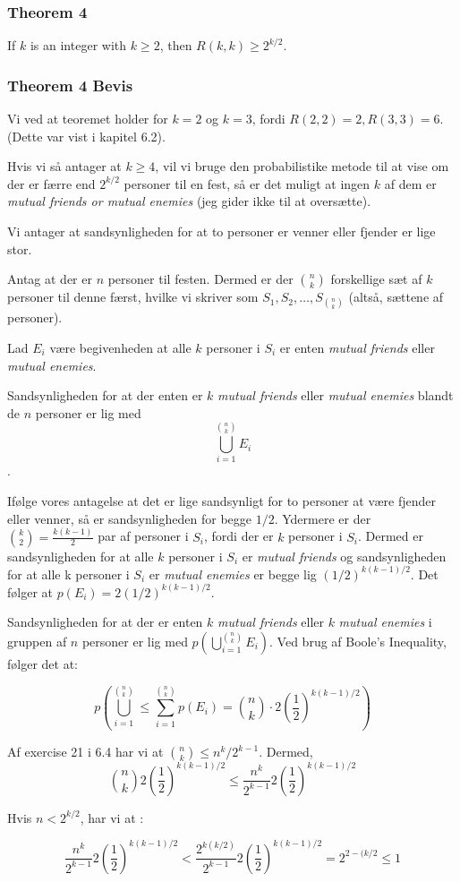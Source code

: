 \documentclass{beamer}
\begin{document}
\begin{frame}
  \frametitle{Theorem 4}
  \begin{theorem}
If $k$ is an integer with $k \geq 2$, then $R(k,k) \geq 2^{k/2}.$
  \end{theorem}
\end{frame}

\begin{frame}[allowframebreaks]
  \frametitle{Theorem 4 Bevis}
  Vi ved at teoremet holder for $k = 2$ og $k = 3$, fordi $R(2,2) = 2, R(3,3) = 6$. (Dette var vist i kapitel 6.2).

  Hvis vi så antager at $k \geq 4$, vil vi bruge den probabilistike metode til at vise om der er færre end $2^{k/2}$ personer til en fest, så er det muligt at ingen $k$ af dem er \textit{mutual friends or mutual enemies} (jeg gider ikke til at oversætte).

  Vi antager at sandsynligheden for at to personer er venner eller fjender er lige stor.

  Antag at der er $n$ personer til festen. Dermed er der $\binom{n}{k}$ forskellige sæt af $k$ personer til denne færst, hvilke vi skriver som $S_{1}, S_{2}, \ldots, S_{\binom{n}{k}}$ (altså, sættene af personer).

  Lad $E_{i}$ være begivenheden at alle $k$  personer i $S_{i}$ er enten \textit{mutual friends} eller \textit{mutual enemies}.

  Sandsynligheden for at der enten er $k$ \textit{mutual friends} eller \textit{mutual enemies} blandt de $n$ personer er lig med \[ \bigcup\limits_{i=1}^{\binom{n}{k}}E_{i} \].

  Ifølge vores antagelse at det er lige sandsynligt for to personer at være fjender eller venner, så er sandsynligheden for begge $1/2$. Ydermere er der $\binom{k}{2} = \frac{k(k-1)}{2}$ par af personer i $S_{i}$, fordi der er $k$ personer i $S_{i}$. Dermed er sandsynligheden for at alle $k$ personer i $S_{i}$ er \textit{mutual friends} og sandsynligheden for at alle k personer i $S_{i}$ er \textit{mutual enemies} er begge lig $(1/2)^{k(k-1)/2}$. Det følger at $p(E_{i}) = 2(1/2)^{k(k-1)/2}$.

  Sandsynligheden for at der er enten $k$ \textit{mutual friends} eller $k$ \textit{mutual enemies} i gruppen af $n$ personer er lig med $p(\bigcup\limits_{i=1}^{\binom{n}{k}} E_{i})$. Ved brug af Boole's Inequality, følger det at:

  \[ p\left( \bigcup\limits_{i=1}^{\binom{n}{k}} \leq \sum_{i=1}^{\binom{n}{k}} p(E_{i}) = \binom{n}{k} \cdot 2 \left( \frac{1}{2} \right)^{k(k-1)/2}   \right) \]

  Af exercise 21 i 6.4 har vi at $\binom{n}{k} \leq n^{k}/2^{k-1}$. Dermed,
  \[ \binom{n}{k} 2 \left( \frac{1}{2} \right)^{k(k-1)/2} \leq \frac{n^{k}}{2^{k-1}}2 \left( \frac{1}{2} \right)^{k(k-1)/2} \]

  Hvis $n < 2^{k/2}$, har vi at :

  \[ \frac{n^{k}}{2^{k-1}}2 \left( \frac{1}{2} \right)^{k(k-1)/2} < \frac{2^{k(k/2)}}{2^{k-1}}2 \left( \frac{1}{2} \right)^{k(k-1)/2} = 2^{2-(k/2} \leq 1 \]
  \end{frame}
\end{document}
